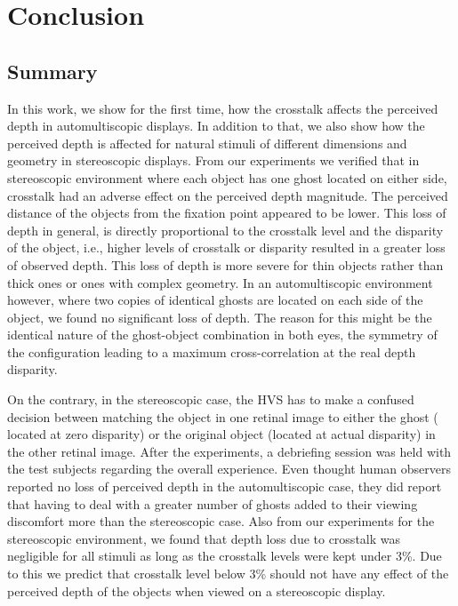 \chapter{Conclusion}
\label{chap:Conclusion}

\section{Summary}
In this work, we show for the first time, how the crosstalk affects the perceived depth in automultiscopic displays. In addition to that, we also show how the perceived depth is affected for natural stimuli of different dimensions and geometry in stereoscopic displays. From our experiments we verified that in stereoscopic environment where each object has one ghost located on either side, crosstalk had an adverse effect on the perceived depth magnitude. The perceived distance of the objects from the fixation point appeared to be lower. This loss of depth in general, is directly proportional to the crosstalk level and the disparity of the object, i.e., higher levels of crosstalk or disparity resulted in a greater loss of observed depth. This loss of depth is more severe for thin objects rather than thick ones or ones with complex geometry. In an automultiscopic environment however, where two copies of identical ghosts are located on each side of the object, we found no significant loss of depth. The reason for this might be the identical nature of the ghost-object combination in both eyes, the symmetry of the configuration leading to a maximum cross-correlation at the real depth disparity. 

On the contrary, in the stereoscopic case, the HVS has to make a confused decision between matching the object in one retinal image to either the ghost ( located at zero disparity) or the original object (located at actual disparity) in the other retinal image. After the experiments, a debriefing session was held with the test subjects regarding the overall experience. Even thought human observers reported no loss of perceived depth in the automultiscopic case, they did report that having to deal with a greater number of ghosts added to their viewing discomfort more than the stereoscopic case. Also from our experiments for the stereoscopic environment, we found that depth loss due to crosstalk was negligible for all stimuli as long as the crosstalk levels were kept under 3\%. Due to this we predict that crosstalk level below 3\% should not have any effect of the perceived depth of the objects when viewed on a stereoscopic display.


